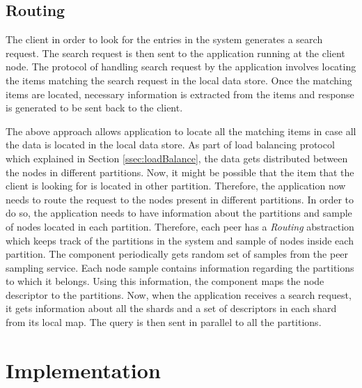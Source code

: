 \documentclass[a4paper,11pt]{kth-mag}
\begin{document}
\section{Routing}
\label{ssec:routing}

\par The client in order to look for the entries in the system generates a search request. The search request is then sent to the application running at the client node. The protocol of handling search request by the application involves locating the items matching the search request in the local data store. Once the matching items are located, necessary information is extracted from the items and response is generated to be sent back to the client.

\par The above approach allows application to locate all the matching items in case all the data is located in the local data store. As part of load balancing protocol which explained in Section \ref{ssec:loadBalance}, the data gets distributed between the nodes in different partitions. Now, it might be possible that the item that the client is looking for is located in other partition. Therefore, the application now needs to route the request to the nodes present in different partitions. In order to do so, the application needs to have information about the partitions and sample of nodes located in each partition. Therefore, each peer has a \textit{Routing} abstraction which keeps track of the partitions in the system and sample of nodes inside each partition. The component periodically gets random set of samples from the peer sampling service. Each node sample contains information regarding the partitions to which it belongs. Using this information, the component maps the node descriptor to the partitions. Now, when the application receives a search request, it gets information about all the shards and a set of descriptors in each shard from its local map. The query is then sent in parallel to all the partitions.




\chapter{Implementation}
\label{chap:impl}
\end{document}

